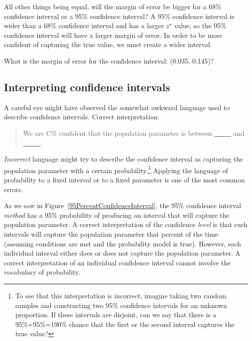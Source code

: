 \begin{examplewrap}
\begin{nexample}{All other things being equal, will the margin of error be bigger for a 68\% confidence interval or a 95\% confidence interval?}
A 95\% confidence interval is wider than a 68\% confidence interval and has a larger $z^{\star}$ value, so the 95\% confidence interval will have a larger margin of error.  In order to be more confident of capturing the true value, we must create a wider interval.
\end{nexample}
\end{examplewrap}

\begin{exercisewrap}
\begin{nexercise}What is the margin of error for the confidence interval: (0.035, 0.145)?\footnotemark
\end{nexercise}
\end{exercisewrap}

\subsection{Interpreting confidence intervals}
\label{interpretingCIs}


A careful eye might have observed the somewhat awkward language used to describe confidence intervals. Correct interpretation:
\begin{quote}
We are C\% confident that the population parameter is between \underline{\ \ \ \ \ } and \underline{\ \ \ \ \ }.
\end{quote}
\emph{Incorrect} language might try to describe the confidence interval as capturing the population parameter with a certain probability.\footnote{To see that this interpretation is incorrect, imagine taking two random samples and constructing two 95\% confidence intervals for an unknown proportion. If these intervals are disjoint, can we say that there is a 95\%+95\%=190\% chance that the first or the second interval captures the true value?} Applying the language of probability to a fixed interval or to a fixed parameter is one of the most common errors.  

As we saw in Figure~\ref{95PercentConfidenceInterval}, the 95\% confidence interval \emph{method} has a 95\% probability of producing an interval that will capture the population parameter. A correct interpretation of the confidence \emph{level} is that such intervals will capture the population parameter that percent of the time (assuming conditions are met and the probability model is true). However, each individual interval either does or does not capture the population parameter. A correct interpretation of an individual confidence interval cannot involve the vocabulary of probability.

